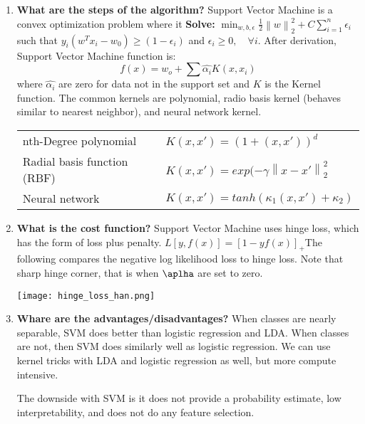 \documentclass{article}
\begin{document}
\begin{enumerate}
    \item \textbf{What are the steps of the algorithm?}
    \noindent 
    \smallbreak
    Support Vector Machine is a convex optimization problem where it \textbf{Solve:} $\min_{w, b, \epsilon}\frac{1}{2}\left\|w\right\|_{2}^{2} + C\sum_{i=1}^{n} \epsilon_i$ such that $y_i(w^{T} x_i - w_0) \geq (1 - \epsilon_i)$ and $\epsilon_i \geq 0, \quad \forall i$. After derivation, Support Vector Machine function is:
    $$f(x) = w_o + \sum \hat{\alpha_i}K(x, x_i)$$
    where $\hat{\alpha_i}$ are zero for data not in the support set and $K$ is the Kernel function. The common kernels are polynomial, radio basis kernel (behaves similar to nearest neighbor), and neural network kernel. \cite{1}
    \begin{center}
      \begin{tabular}{ l l }
        \hline
        nth-Degree polynomial & $K(x,x') = (1 + (x, x'))^d$ \\
        Radial basis function (RBF) & $K(x, x') = exp(-\gamma\left\|x - x'\right\|_{2}^{2}$ \\ 
        Neural network & $K(x, x') = tanh(\kappa_1(x, x') + \kappa_2)$ \\ 
        \hline
      \end{tabular}
    \end{center}
    
    \item \textbf{What is the cost function?}
    \noindent 
    \smallbreak
    Support Vector Machine uses hinge loss, which has the form of loss plus penalty. $L[y, f(x)] = [1 - yf(x)]_{+}$The following compares the negative log likelihood loss to hinge loss. Note that sharp hinge corner, that is when $\aplha$ are set to zero.
    
    \texttt{[image: hinge\_loss\_han.png]}
    
    \item \textbf{Whare are the advantages/disadvantages?}
    \noindent 
    \smallbreak
    When classes are nearly separable, SVM does better than logistic regression and LDA. When classes are not, then SVM does similarly well as logistic regression. We can use kernel tricks with LDA and logistic regression as well, but more compute intensive.
    
    The downside with SVM is it does not provide a probability estimate, low interpretability, and does not do any feature selection.
    
\end{enumerate}
\end{document}
